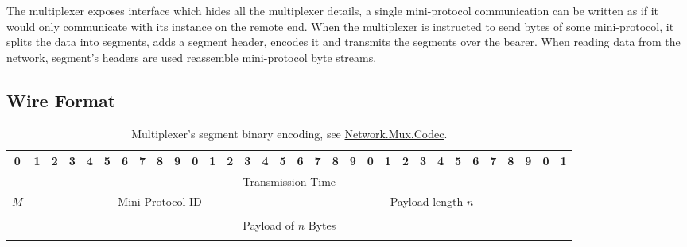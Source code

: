 The multiplexer exposes interface which hides all the multiplexer details,
a single mini-protocol communication can be written as if it would only
communicate with its instance on the remote end.  When the multiplexer is
instructed to send bytes of some mini-protocol, it splits the data into
segments, adds a segment header, encodes it and transmits the segments over the
bearer.  When reading data from the network, segment's headers are used
reassemble mini-protocol byte streams.

\subsection{Wire Format}
\label{section:wire-format}

\begin{table}
  \begin{center}
    \begingroup
    \setlength{\tabcolsep}{3pt}
    \begin{tabular}{|c|c|c|c|c|c|c|c|c|c|c|c|c|c|c|c|c|c|c|c|c|c|c|c|c|c|c|c|c|c|c|c|}
      \hline
      0&1&2&3&4&5&6&7&8&9&0&1&2&3&4&5&6&7&8&9&0&1&2&3&4&5&6&7&8&9&0&1 \\ \hline
      \multicolumn{32}{|c|}{Transmission Time} \\ \hline
      \multicolumn{1}{|c|}{$M$}
      &\multicolumn{15}{|c|}{Mini Protocol ID}
      &\multicolumn{16}{|c|}{Payload-length $n$} \\ \hline
      \multicolumn{32}{|c|}{} \\
      \multicolumn{32}{|c|}{Payload of $n$ Bytes} \\
      \multicolumn{32}{|c|}{} \\ \hline
    \end{tabular}
    \endgroup
    \caption{Multiplexer's segment binary encoding, see
    \href{https://ouroboros-network.cardano.intersectmbo.org/network-mux/Network-Mux-Codec}{Network.Mux.Codec}.}
    \label{segment-header}
  \end{center}
\end{table}

